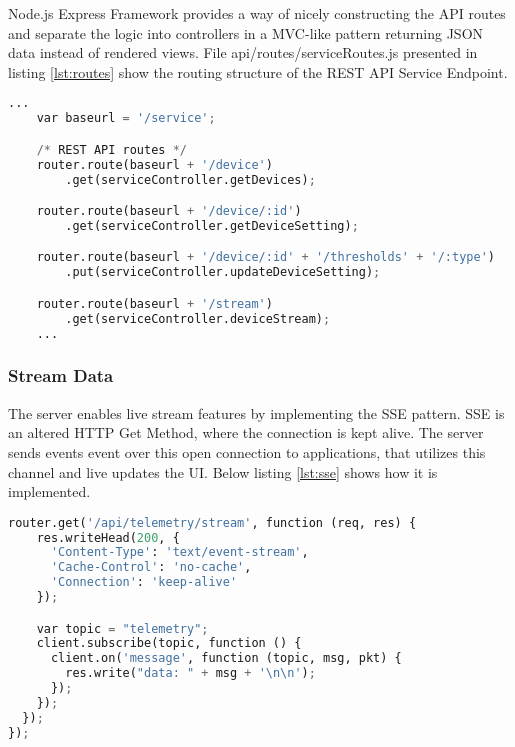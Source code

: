    Node.js Express Framework provides a way of nicely constructing the API routes and separate the logic into controllers in a MVC-like pattern returning JSON data instead of rendered views. File api/routes/serviceRoutes.js presented in listing \ref{lst:routes} show the routing structure of the REST API Service Endpoint. 

\begin{lstlisting}[language=Python, caption=Node.js REST API Routes, label={lst:routes}, basicstyle=\scriptsize]
    ...
    var baseurl = '/service';

    /* REST API routes */
    router.route(baseurl + '/device')
        .get(serviceController.getDevices);

    router.route(baseurl + '/device/:id')
        .get(serviceController.getDeviceSetting);

    router.route(baseurl + '/device/:id' + '/thresholds' + '/:type')
        .put(serviceController.updateDeviceSetting);

    router.route(baseurl + '/stream')
        .get(serviceController.deviceStream); 
    ...
\end{lstlisting}

\subsubsection*{Stream Data}
The server enables live stream features by implementing the SSE pattern. SSE is an altered HTTP Get Method, where the connection is kept alive. The server sends events event over this open connection to applications, that utilizes this channel and live updates the UI. Below listing \ref{lst:sse} shows how it is implemented.

\begin{lstlisting}[language=Python, caption=Server Sent Event, label={lst:sse}, basicstyle=\scriptsize]
    router.get('/api/telemetry/stream', function (req, res) {
    res.writeHead(200, {
      'Content-Type': 'text/event-stream',
      'Cache-Control': 'no-cache',
      'Connection': 'keep-alive'
    });

    var topic = "telemetry";
    client.subscribe(topic, function () {
      client.on('message', function (topic, msg, pkt) {
        res.write("data: " + msg + '\n\n');
      });
    });
  });
});
\end{lstlisting}

